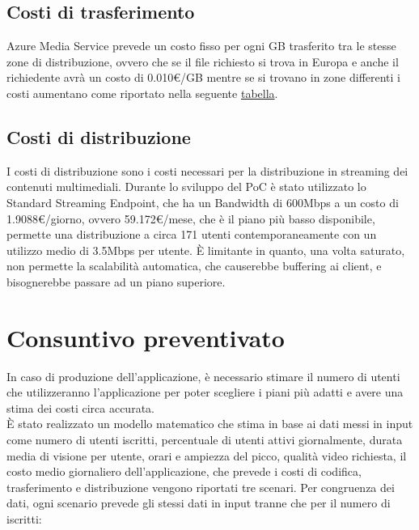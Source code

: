 \subsection{Costi di trasferimento}
Azure Media Service prevede un costo fisso per ogni GB trasferito tra le stesse zone di distribuzione, ovvero che se il file richiesto si trova in Europa e anche il richiedente avrà un costo di 0.010€/GB mentre se si trovano in zone differenti i costi aumentano come riportato nella seguente \href{https://azure.microsoft.com/en-us/pricing/details/media-services/\#pricing}{tabella}.

\subsection{Costi di distribuzione}
\label{subsec:costi-distribuzione}
I costi di distribuzione sono i costi necessari per la distribuzione in streaming dei contenuti multimediali. Durante lo sviluppo del PoC è stato utilizzato lo Standard Streaming Endpoint, che ha un Bandwidth di 600Mbps a un costo di 1.9088€/giorno, ovvero 59.172€/mese, che è il piano più basso disponibile, permette una distribuzione a circa 171 utenti contemporaneamente con un utilizzo medio di 3.5Mbps per utente. È limitante in quanto, una volta saturato, non permette la scalabilità automatica, che causerebbe buffering ai client, e bisognerebbe passare ad un piano superiore.\\

\section{Consuntivo preventivato}
In caso di produzione dell'applicazione, è necessario stimare il numero di utenti che utilizzeranno l'applicazione per poter scegliere i piani più adatti e avere una stima dei costi circa accurata.\\
È stato realizzato un modello matematico che stima in base ai dati messi in input come numero di utenti iscritti, percentuale di utenti attivi giornalmente, durata media di visione per utente, orari e ampiezza del picco, qualità video richiesta, il costo medio giornaliero dell'applicazione, che prevede i costi di codifica, trasferimento e distribuzione vengono riportati tre scenari.
Per congruenza dei dati, ogni scenario prevede gli stessi dati in input tranne che per il numero di iscritti:

